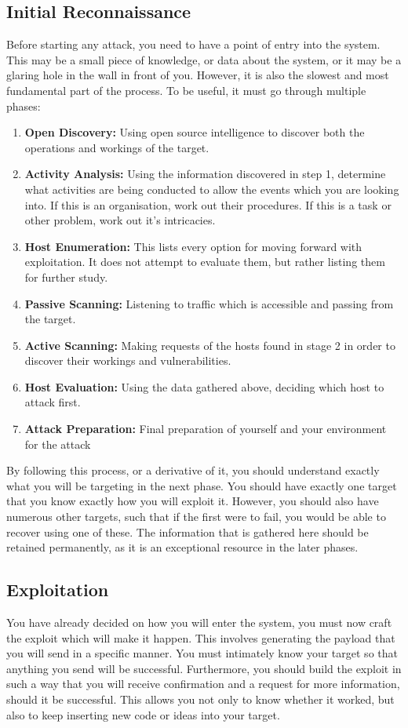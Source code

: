		\subsection{Initial Reconnaissance}
			Before starting any attack, you need to have a point of entry into the system.
			This may be a small piece of knowledge, or data about the system, or it may be a glaring hole in the wall in front of you.
			However, it is also the slowest and most fundamental part of the process.
			To be useful, it must go through multiple phases:
			\begin{enumerate}
				\item \textbf{Open Discovery:} Using open source intelligence to discover both the operations and workings of the target.
				\item \textbf{Activity Analysis:} Using the information discovered in step 1, determine what activities are being conducted to allow the events which you are looking into.
					If this is an organisation, work out their procedures.
					If this is a task or other problem, work out it's intricacies.
				\item \textbf{Host Enumeration:} This lists every option for moving forward with exploitation.
					It does not attempt to evaluate them, but rather listing them for further study.
				\item \textbf{Passive Scanning:} Listening to traffic which is accessible and passing from the target.
				\item \textbf{Active Scanning:} Making requests of the hosts found in stage 2 in order to discover their workings and vulnerabilities.
				\item \textbf{Host Evaluation:} Using the data gathered above, deciding which host to attack first.
				\item \textbf{Attack Preparation:} Final preparation of yourself and your environment for the attack
			\end{enumerate}

			By following this process, or a derivative of it, you should understand exactly what you will be targeting in the next phase.
			You should have exactly one target that you know exactly how you will exploit it.
			However, you should also have numerous other targets, such that if the first were to fail, you would be able to recover using one of these.
			The information that is gathered here should be retained permanently, as it is an exceptional resource in the later phases.

		\subsection{Exploitation}
			You have already decided on how you will enter the system, you must now craft the exploit which will make it happen.
			This involves generating the payload that you will send in a specific manner.
			You must intimately know your target so that anything you send will be successful.
			Furthermore, you should build the exploit in such a way that you will receive confirmation and a request for more information, should it be successful.
			This allows you not only to know whether it worked, but also to keep inserting new code or ideas into your target.

